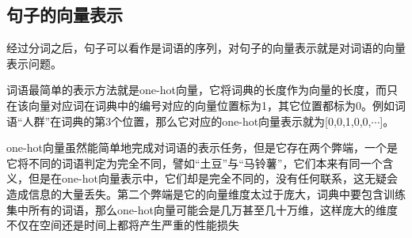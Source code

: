 \documentclass[UTF8]{ctexart}
\begin{document}
\subsection{句子的向量表示}
经过分词之后，句子可以看作是词语的序列，对句子的向量表示就是对词语的向量表示问题。

词语最简单的表示方法就是one-hot向量，它将词典的长度作为向量的长度，而只在该向量对应词在词典中的编号对应的向量位置标为1，其它位置都标为0。例如词语“人群”在词典的第3个位置，那么它对应的one-hot向量表示就为[0,0,1,0,0,$\cdots$]。

one-hot向量虽然能简单地完成对词语的表示任务，但是它存在两个弊端，一个是它将不同的词语判定为完全不同，譬如“土豆”与“马铃薯”，它们本来有同一个含义，但是在one-hot向量表示中，它们却是完全不同的，没有任何联系，这无疑会造成信息的大量丢失。第二个弊端是它的向量维度太过于庞大，词典中要包含训练集中所有的词语，那么one-hot向量可能会是几万甚至几十万维，这样庞大的维度不仅在空间还是时间上都将产生严重的性能损失
\end{document}
